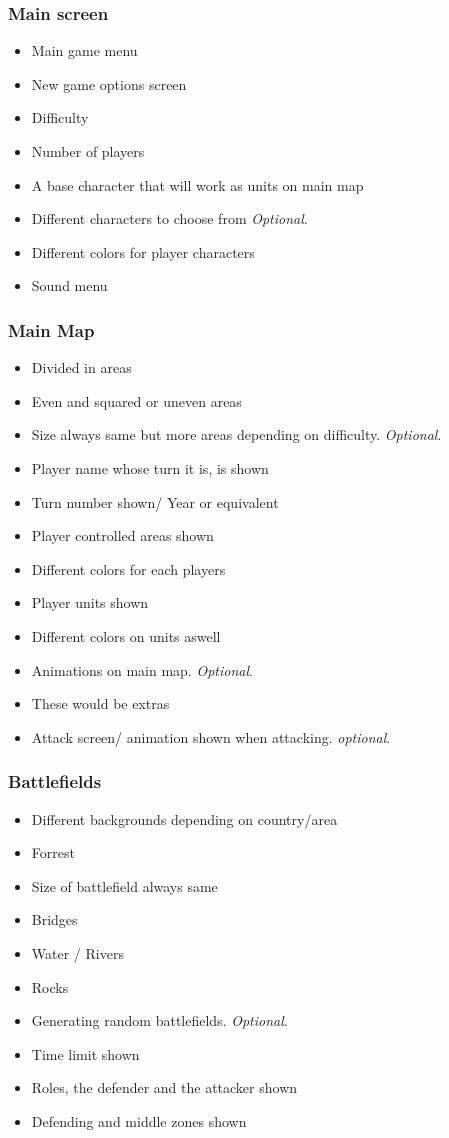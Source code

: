 \documentclass[12pt,a4paper]{article}
\begin{document}
\subsubsection{Main screen}
\begin{itemize}
\item Main game menu
\item New game options screen
\item Difficulty
\item Number of players
\item A base character that will work as units on main map
\item Different characters to choose from \emph{Optional}.
\item Different colors for player characters
\item Sound menu
\end{itemize}

\subsubsection{Main Map}
\begin{itemize}
\item Divided in areas
\item Even and squared or uneven areas
\item Size always same but more areas depending on difficulty. \emph{Optional}.
\item Player name whose turn it is, is shown 
\item Turn number shown/ Year or equivalent
\item Player controlled areas shown
\item Different colors for each players
\item Player units shown
\item Different colors on units aswell
\item Animations on main map. \emph{Optional}.
\item These would be extras
\item Attack screen/ animation shown when attacking. \emph{optional}.
\end{itemize}

\subsubsection{Battlefields}
\begin{itemize}
\item Different backgrounds depending on country/area
\item Forrest
\item Size of battlefield always same
\item Bridges
\item Water / Rivers
\item Rocks
\item Generating random battlefields. \emph{Optional}.
\item Time limit shown
\item Roles, the defender and the attacker shown
\item Defending and middle zones shown
\end{itemize}
\end{document}
